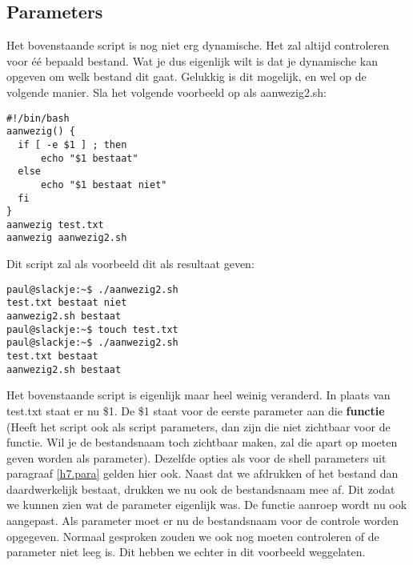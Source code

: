 \subsection{Parameters}
Het bovenstaande script is nog niet erg dynamische. Het zal altijd controleren voor \'{e}\'{e} bepaald bestand. Wat je dus eigenlijk wilt is dat je dynamische kan opgeven om welk bestand dit gaat. Gelukkig is dit mogelijk, en wel op de volgende manier. Sla het volgende voorbeeld op als aanwezig2.sh:
\begin{lstlisting}
#!/bin/bash
aanwezig() {
  if [ -e $1 ] ; then
      echo "$1 bestaat"
  else
      echo "$1 bestaat niet"
  fi
}
aanwezig test.txt
aanwezig aanwezig2.sh
\end{lstlisting}%
Dit script zal als voorbeeld dit als resultaat geven:
\begin{lstlisting}
paul@slackje:~$ ./aanwezig2.sh 
test.txt bestaat niet
aanwezig2.sh bestaat
paul@slackje:~$ touch test.txt
paul@slackje:~$ ./aanwezig2.sh 
test.txt bestaat
aanwezig2.sh bestaat
\end{lstlisting}%
Het bovenstaande script is eigenlijk maar heel weinig veranderd. In plaats van test.txt staat er nu \$1. De \$1 staat voor de eerste parameter aan die \textbf{functie} (Heeft het script ook als script parameters, dan zijn die niet zichtbaar voor de functie. Wil je de bestandsnaam toch zichtbaar maken, zal die apart op moeten geven worden als parameter). Dezelfde opties als voor de shell parameters uit paragraaf \ref{h7.para} gelden hier ook. Naast dat we afdrukken of het bestand dan daardwerkelijk bestaat, drukken we nu ook de bestandsnaam mee af. Dit zodat we kunnen zien wat de parameter eigenlijk was.
De functie aanroep wordt nu ook aangepast. Als parameter moet er nu de bestandsnaam voor de controle worden opgegeven. Normaal gesproken zouden we ook nog moeten controleren of de parameter niet leeg is. Dit hebben we echter in dit voorbeeld weggelaten.

